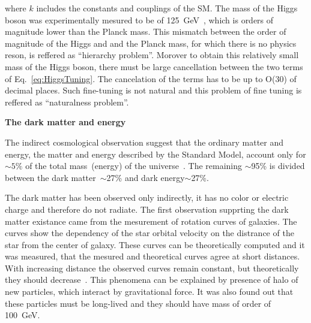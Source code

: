 where $k$ includes the constants and couplings of the SM. The mass of the Higgs boson was experimentally mesured to be of 125~GeV~\cite{Chatrchyan:2012xdj, Aad:2012tfa}, which is orders of magnitude lower than the Planck mass. This mismatch between the order of magnitude of the Higgs and and the Planck mass, for which there is no physics reson, is reffered as ``hierarchy problem''. Morover to obtain this relatively small mass of the Higgs boson, there must be large cancellation between the two terms of Eq.~\ref{eq:HiggsTuning}. The cancelation of the terms has to be up to O(30) of decimal places. Such fine-tuning is not natural and this problem of fine tuning is reffered as ``naturalness problem''.


\textbf{The dark matter and energy}

The indirect cosmological observation suggest that the ordinary matter and energy, the matter and energy described by the Standard Model, account only for $\sim 5\%$ of the total mass~(energy) of the universe~\cite{Bertone:2004pz, Gaitskell:2004gd, Bennett:2012zja}. The remaining $\sim$95\% is divided between the dark matter~$\sim$27\% and dark energy$\sim$27\%.

The dark matter has been observed only indirectly, it has no color or electric charge and therefore do not radiate. The first observation supprting the dark matter existance came from the mesurement of rotation curves of galaxies. The curves show the dependency of the star orbital velocity on the distrance of the star from the center of galaxy. These curves can be theoretically computed and it was measured, that the mesured and theoretical curves agree at short distances. With increasing distance the observed curves remain constant, but theoretically they should decrease~\cite{Bertone:2004pz}. This phenomena can be explained by presence of halo of new particles, which interact by gravitational force. It was also found out that these particles must be long-lived and they should have mass of order of 100~GeV.

